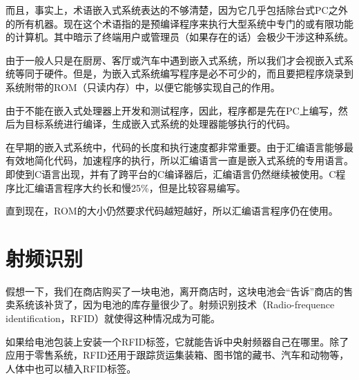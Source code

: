 而且，事实上，术语嵌入式系统表达的不够清楚，因为它几乎包括除台式PC之外的所有机器。现在这个术语指的是预编译程序来执行大型系统中专门的或有限功能的计算机。其中暗示了终端用户或管理员（如果存在的话）会极少干涉这种系统。

由于一般人只是在厨房、客厅或汽车中遇到嵌入式系统，所以我们才会视嵌入式系统等同于硬件。但是，为嵌入式系统编写程序是必不可少的，而且要把程序烧录到系统附带的ROM（只读内存）中，以便它能够实现自己的作用。

由于不能在嵌入式处理器上开发和测试程序，因此，程序都是先在PC上编写，然后为目标系统进行编译，生成嵌入式系统的处理器能够执行的代码。

在早期的嵌入式系统中，代码的长度和执行速度都非常重要。由于汇编语言能够最有效地简化代码，加速程序的执行，所以汇编语言一直是嵌入式系统的专用语言。即使到C语言出现，并有了跨平台的C编译器后，汇编语言仍然继续被使用。C程序比汇编语言程序大约长和慢25\%，但是比较容易编写。

直到现在，ROM的大小仍然要求代码越短越好，所以汇编语言程序仍在使用。



\chapter{射频识别}


假想一下，我们在商店购买了一块电池，离开商店时，这块电池会“告诉”商店的售卖系统该补货了，因为电池的库存量很少了。射频识别技术（Radio-frequence identification，RFID）就使得这种情况成为可能。

如果给电池包装上安装一个RFID标签，它就能告诉中央射频器自己在哪里。除了应用于零售系统，RFID还用于跟踪货运集装箱、图书馆的藏书、汽车和动物等，人体中也可以植入RFID标签。